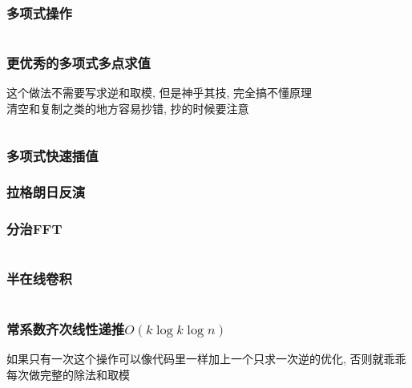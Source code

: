 \documentclass[a4paper]{article}
\begin{document}
\begin{multicols}{2}

			
				\subsubsection{多项式操作}
					\inputminted{cpp}{../src/math/多项式操作.cpp}

				\subsubsection{更优秀的多项式多点求值}
					这个做法不需要写求逆和取模, 但是神乎其技, 完全搞不懂原理 \\
					清空和复制之类的地方容易抄错, 抄的时候要注意
					\inputminted{cpp}{../src/math/更优秀的多项式多点求值.cpp}

				\subsubsection{多项式快速插值}
					



				\subsubsection{拉格朗日反演}
					

				\subsubsection{分治FFT}
					\inputminted{cpp}{../src/math/分治FFT.cpp}

				\subsubsection{半在线卷积}
					\inputminted{cpp}{../src/math/半在线卷积.cpp}
				
				\subsubsection{常系数齐次线性递推$O(k\log k\log n)$}
					如果只有一次这个操作可以像代码里一样加上一个只求一次逆的优化, 否则就乖乖每次做完整的除法和取模
					\inputminted{cpp}{../src/math/常系数齐次线性递推.cpp}
				


\end{multicols}
\end{document}
